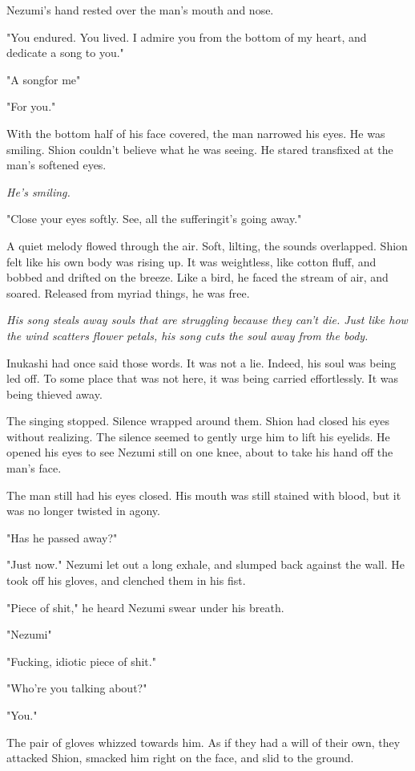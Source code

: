 Nezumi's hand rested over the man's mouth and nose.

"You endured. You lived. I admire you from the bottom of my heart, and
dedicate a song to you."

"A song\el for me\el "

"For you."

With the bottom half of his face covered, the man narrowed his eyes. He
was smiling. Shion couldn't believe what he was seeing. He stared
transfixed at the man's softened eyes.

\emph{He's smiling.}

"Close your eyes softly. See, all the suffering\el it's going away."

A quiet melody flowed through the air. Soft, lilting, the sounds
overlapped. Shion felt like his own body was rising up. It was
weightless, like cotton fluff, and bobbed and drifted on the breeze.
Like a bird, he faced the stream of air, and soared. Released from
myriad things, he was free.

\emph{His song steals away souls that are struggling because they can't die.
Just like how the wind scatters flower petals, his song cuts the soul
away from the body.}

Inukashi had once said those words. It was not a lie. Indeed, his soul
was being led off. To some place that was not here, it was being carried
effortlessly. It was being thieved away.

\mybreak

The singing stopped. Silence wrapped around them. Shion had closed his
eyes without realizing. The silence seemed to gently urge him to lift
his eyelids. He opened his eyes to see Nezumi still on one knee, about
to take his hand off the man's face.

The man still had his eyes closed. His mouth was still stained with
blood, but it was no longer twisted in agony.~

"Has he passed away?"

"Just now." Nezumi let out a long exhale, and slumped back against the
wall. He took off his gloves, and clenched them in his fist.

"Piece of shit," he heard Nezumi swear under his breath.

"Nezumi\el "

"Fucking, idiotic piece of shit."

"Who're you talking about?"

"You."

The pair of gloves whizzed towards him. As if they had a will of their
own, they attacked Shion, smacked him right on the face, and slid to the
ground.

